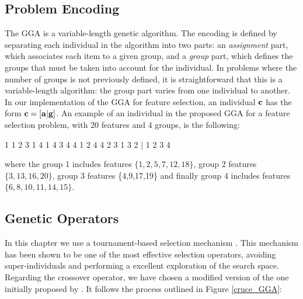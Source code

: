 \subsection{Problem Encoding}\label{encoding}

The GGA is a variable-length genetic algorithm. The encoding is defined by separating each individual in the algorithm into two parts: an {\em assignment} part, which associates each item to a given group, and a {\em group} part, which defines the groups that must be taken into account for the individual. In problems where the number of groups is not previously defined, it is straightforward that this is a variable-length algorithm: the group part varies from one individual to another. In our implementation of the GGA for feature selection, an individual ${\bf c}$ has the form ${\bf c}=[{\bf a}|{\bf g}]$. An example of an individual in the proposed GGA for a feature selection problem, with 20 features and 4 groups, is the following:

1 1 2 3 1 4 1 4 3 4 4 1 2 4 4 2 3 1 3 2 $|$ 1 2 3 4

where the group 1 includes features $\{1,2,5,7,12,18\}$, group 2 features $\{3,13,16,20\}$, group 3 features \{4,9,17,19\} and finally group 4 includes features $\{6,8,10,11,14,15\}$.

\subsection{Genetic Operators}

In this chapter we use a tournament-based selection mechanism \citep{yao1999evolutionary}. This mechanism has been shown to be one of the most effective selection operators, avoiding super-individuals and performing a excellent exploration of the search space. Regarding the crossover operator, we have chosen a modified version of the one initially proposed by \cite{falkenauer1993grouping,falkenauer1998genetic}. It follows the process outlined in Figure \ref{cruce_GGA}:

